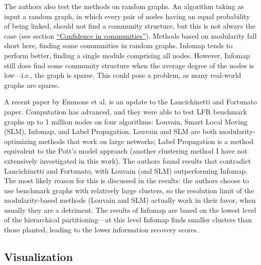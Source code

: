 The authors also test the methods on random graphs. An algorithm taking
as input a random graph, in which every pair of nodes having an equal
probability of being linked, should not find a community structure, but
this is not always the case (see section
\protect\hyperlink{confidence-in-communities}{``Confidence in
communities''}). Methods based on modularity fall short here, finding
some communities in random graphs. Infomap tends to perform better,
finding a single module comprising all nodes. However, Infomap still
does find some community structure when the average degree of the nodes
is low---i.e., the graph is sparse. This could pose a problem, as many
real-world graphs are sparse.

A recent paper by Emmons et al. \autocite{emmons_analysis_2016} is an
update to the Lancichinetti and Fortunato paper. Computation has
advanced, and they were able to test LFR benchmark graphs up to 1
million nodes on four algorithms: Louvain, Smart Local Moving (SLM),
Infomap, and Label Propagation. Louvain and SLM are both
modularity-optimizing methods that work on large networks; Label
Propagation is a method equivalent to the Pott's model approach (another
clustering method I have not extensively investigated in this work). The
authors found results that contradict Lancichinetti and Fortunato, with
Louvain (and SLM) outperforming Infomap. The most likely reason for this
is discussed in the results: the authors choose to use benchmark graphs
with relatively large clusters, so the resolution limit of the
modularity-based methods (Louvain and SLM) actually work in their favor,
when usually they are a detriment. The results of Infomap are based on
the lowest level of the hierarchical partitioning---at this level
Infomap finds smaller clusters than those planted, leading to the lower
information recovery scores.


\subsection{Visualization}\label{visualization}
